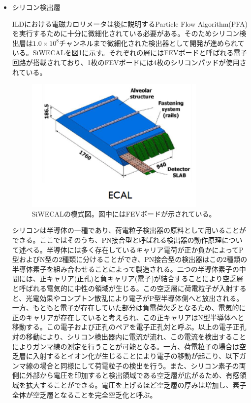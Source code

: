 \begin{itemize}
\item シリコン検出層

ILDにおける電磁カロリメータは後に説明するParticle Flow Algorithm(PFA)を実行するために十分に微細化されている必要がある。そのためシリコン検出層は$1.0\times10^{8}$チャンネルまで微細化された検出器として開発が進められている。SiWECALを図\ref{ECAL_layer}に示す。それぞれの層にはFEVボードと呼ばれる電子回路が搭載されており、1枚のFEVボードには4枚のシリコンパッドが使用されている。

\begin{figure}[H]
	\begin{center}
		\includegraphics[width=250pt]{./Figure/EcalDetector/ECAL_layer.png}
		\caption[SiWECAL]{SiWECALの模式図。図中にはFEVボードが示されている。}
		\label{ECAL_layer}
	\end{center}
\end{figure}

シリコンは半導体の一種であり、荷電粒子検出器の原料として用いることができる。ここではそのうち、PN接合型と呼ばれる検出器の動作原理について述べる。半導体には多く存在しているキャリア電荷が正か負かによってP型およびN型の2種類に分けることができ、PN接合型の検出器はこの2種類の半導体素子を組み合わせることによって製造される。二つの半導体素子の中間には、正キャリア(正孔)と負キャリア(電子)が結合することにより空乏層と呼ばれる電気的に中性の領域が生じる。この空乏層に荷電粒子が入射すると、光電効果やコンプトン散乱により電子がP型半導体側へと放出される。一方、もともと電子が存在していた部分は負電荷欠乏となるため、電気的に正のキャリアが存在していると考えられ、この正キャリアはN型半導体へと移動する。この電子および正孔のペアを電子正孔対と呼ぶ。以上の電子正孔対の移動により、シリコン検出器内に電流が流れ、この電流を検出することによりガンマ線の測定を行うことが可能となる。一方、荷電粒子の場合は空乏層に入射するとイオン化が生じることにより電子の移動が起こり、以下ガンマ線の場合と同様にして荷電粒子の検出を行う。また、シリコン素子の両側に外部から電圧を印加すると検出領域である空乏層が広がるため、有感領域を拡大することができる。電圧を上げるほど空乏層の厚みは増加し、素子全体が空乏層となることを完全空乏化と呼ぶ。



\end{itemize}

